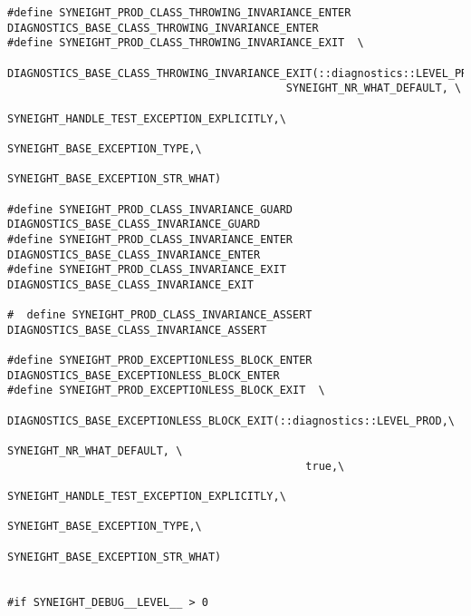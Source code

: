\begin{verbatim}
#define SYNEIGHT_PROD_CLASS_THROWING_INVARIANCE_ENTER DIAGNOSTICS_BASE_CLASS_THROWING_INVARIANCE_ENTER
#define SYNEIGHT_PROD_CLASS_THROWING_INVARIANCE_EXIT  \
    DIAGNOSTICS_BASE_CLASS_THROWING_INVARIANCE_EXIT(::diagnostics::LEVEL_PROD,\
                                           SYNEIGHT_NR_WHAT_DEFAULT, \
                                           SYNEIGHT_HANDLE_TEST_EXCEPTION_EXPLICITLY,\
                                           SYNEIGHT_BASE_EXCEPTION_TYPE,\
                                           SYNEIGHT_BASE_EXCEPTION_STR_WHAT)

#define SYNEIGHT_PROD_CLASS_INVARIANCE_GUARD DIAGNOSTICS_BASE_CLASS_INVARIANCE_GUARD
#define SYNEIGHT_PROD_CLASS_INVARIANCE_ENTER DIAGNOSTICS_BASE_CLASS_INVARIANCE_ENTER
#define SYNEIGHT_PROD_CLASS_INVARIANCE_EXIT  DIAGNOSTICS_BASE_CLASS_INVARIANCE_EXIT

#  define SYNEIGHT_PROD_CLASS_INVARIANCE_ASSERT  DIAGNOSTICS_BASE_CLASS_INVARIANCE_ASSERT

#define SYNEIGHT_PROD_EXCEPTIONLESS_BLOCK_ENTER  DIAGNOSTICS_BASE_EXCEPTIONLESS_BLOCK_ENTER
#define SYNEIGHT_PROD_EXCEPTIONLESS_BLOCK_EXIT  \
    DIAGNOSTICS_BASE_EXCEPTIONLESS_BLOCK_EXIT(::diagnostics::LEVEL_PROD,\
                                              SYNEIGHT_NR_WHAT_DEFAULT, \
                                              true,\
                                              SYNEIGHT_HANDLE_TEST_EXCEPTION_EXPLICITLY,\
                                              SYNEIGHT_BASE_EXCEPTION_TYPE,\
                                              SYNEIGHT_BASE_EXCEPTION_STR_WHAT)


#if SYNEIGHT_DEBUG__LEVEL__ > 0


\end{verbatim}
